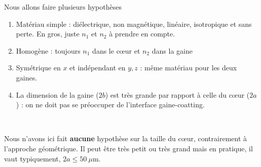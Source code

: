 Nous allons faire plusieurs hypothèses
\begin{enumerate}
\item Matériau simple : diélectrique, non magnétique, linéaire, isotropique et sans perte. En gros,
juste $n_1$ et $n_2$ à prendre en compte.
\item Homogène : toujours $n_1$ dans le cœur et $n_2$ dans la gaine
\item Symétrique en $x$ et indépendant en $y,z$ : même matériau pour les deux gaines.
\item La dimension de la gaine ($2b$) est très grande par rapport à celle du cœur ($2a$) : on ne doit
pas se préoccuper de l'interface gaine-coatting.
\end{enumerate}\ 

Nous n'avons ici fait \textbf{aucune} hypothèse sur la taille du cœur, contrairement à l'approche
géométrique. Il peut être très petit ou très grand mais en pratique, il vaut typiquement, $2a \leq 50\
 \mu$m.\\
 

